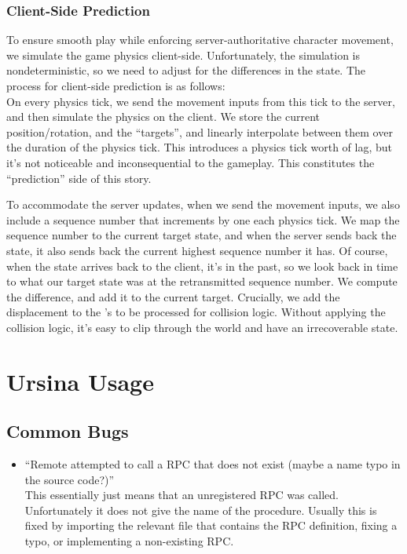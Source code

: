 \documentclass{article}
\begin{document}
\subsubsection{Client-Side Prediction}
To ensure smooth play while enforcing server-authoritative character movement,
we simulate the game physics client-side. Unfortunately, the simulation
is nondeterministic, so we need to adjust for the differences in the state.
The process for client-side prediction is as follows:\\
On every physics tick, we send the movement inputs from this tick to
the server, and then simulate the physics on the client. We store the
current position/rotation, and the ``targets'', and linearly interpolate
between them over the duration of the physics tick. This introduces a
physics tick worth of lag, but it's not noticeable and inconsequential
to the gameplay. This constitutes the ``prediction'' side of this story.

To accommodate the server updates, when we send the movement inputs, we
also include a sequence number that increments by one each physics
tick. We map the sequence number to the current target state, and
when the server sends back the state, it also sends back the current
highest sequence number it has. Of course, when the state arrives back
to the client, it's in the past, so we look back in time to what our
target state was at the retransmitted sequence number. We compute the
difference, and add it to the current target. Crucially, we add the
displacement to the 's 
to be processed for collision logic. Without applying the collision logic, it's easy to clip through the world and have an irrecoverable state.


\section{Ursina Usage}
\subsection{Common Bugs}
\begin{itemize}
    \item ``Remote attempted to call a RPC that does not exist (maybe a name typo in the source code?)''\\
        This essentially just means that an unregistered RPC was called. Unfortunately it does not give
        the name of the procedure. Usually this is fixed by importing the relevant file that contains the
        RPC definition, fixing a typo, or implementing a non-existing RPC.
\end{itemize}
\end{document}
